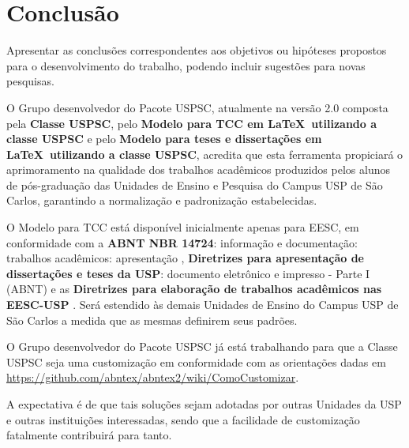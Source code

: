 \chapter{Conclusão}
Apresentar as conclusões correspondentes aos objetivos ou hipóteses propostos para o desenvolvimento do trabalho, podendo incluir  sugestões para novas pesquisas.

O Grupo desenvolvedor do Pacote USPSC, atualmente na versão 2.0 composta pela \textbf{Classe USPSC}, pelo \textbf{Modelo para TCC em \LaTeX\ utilizando a classe USPSC} e pelo \textbf{Modelo para teses e dissertações em \LaTeX\ utilizando a classe USPSC}, acredita que esta ferramenta propiciará o aprimoramento na qualidade dos trabalhos acadêmicos produzidos pelos alunos de pós-graduação das Unidades de Ensino e Pesquisa do Campus USP de São Carlos, garantindo a normalização e padronização estabelecidas.

O Modelo para TCC está disponível inicialmente apenas para EESC, em conformidade com a \textbf{ABNT NBR 14724}: informação e documentação: trabalhos acadêmicos: apresentação \cite{nbr14724}, \textbf{Diretrizes para apresentação de dissertações e teses da USP}: documento eletrônico e impresso - Parte I (ABNT) \cite{sibi2016} e as \textbf{Diretrizes para elaboração de trabalhos acadêmicos nas EESC-USP} \cite{eesc2016}. Será estendido às demais Unidades de Ensino do Campus USP de São Carlos a medida que as mesmas definirem seus padrões. 


O Grupo desenvolvedor do Pacote USPSC já está trabalhando para que a Classe USPSC seja uma  customização em conformidade com as orientações dadas em \url{https://github.com/abntex/abntex2/wiki/ComoCustomizar}.

A expectativa é de que tais soluções sejam adotadas por outras Unidades da USP e outras instituições interessadas, sendo que a facilidade de customização fatalmente contribuirá para tanto.

